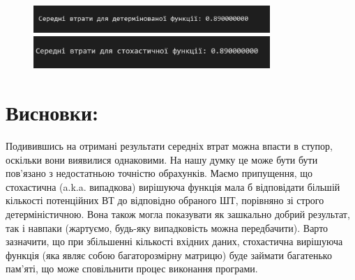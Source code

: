 \begin{figure}[!ht]
        \centering
        \begin{minipage}{0.85\linewidth}
            \includegraphics[width=0.8\textwidth, scale=0.6]{ReportPic/report_7.1.png}
        \end{minipage}
        \begin{minipage}{0.85\linewidth}
            \includegraphics[width=0.8\textwidth, scale=0.5]{ReportPic/report_7.2.png}
        \end{minipage}
\end{figure}

\section{Висновки:}
Подивившись на отримані результати середніх втрат можна впасти в ступор, оскільки вони виявилися однаковими. На нашу думку це 
може бути бути пов'язано з недостатньою точністю обрахунків. Маємо припущення, що стохастична (a.k.a. випадкова) вирішуюча 
функція мала б відповідати більшій кількості потенційних ВТ до відповідно обраного ШТ, порівняно зі строго детерміністичною. 
Вона також могла показувати як зашкально добрий результат, так і навпаки (жартуємо, будь-яку випадковість можна передбачити). 
Варто зазначити, що при збільшенні кількості вхідних даних, стохастична вирішуюча функція (яка являє собою багаторозмірну 
матрицю) буде займати багатенько пам'яті, що може сповільнити процес виконання програми.


